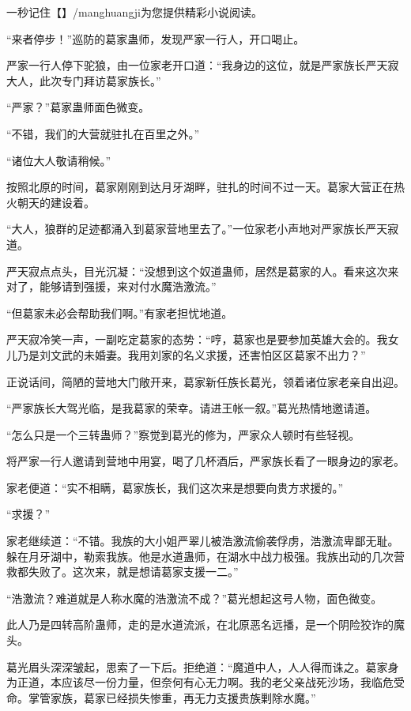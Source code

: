 
\begin{this_body}

一秒记住【】/manghuangji为您提供精彩小说阅读。

“来者停步！”巡防的葛家蛊师，发现严家一行人，开口喝止。

严家一行人停下驼狼，由一位家老开口道：“我身边的这位，就是严家族长严天寂大人，此次专门拜访葛家族长。”

“严家？”葛家蛊师面色微变。

“不错，我们的大营就驻扎在百里之外。”

“诸位大人敬请稍候。”

按照北原的时间，葛家刚刚到达月牙湖畔，驻扎的时间不过一天。葛家大营正在热火朝天的建设着。

“大人，狼群的足迹都涌入到葛家营地里去了。”一位家老小声地对严家族长严天寂道。

严天寂点点头，目光沉凝：“没想到这个奴道蛊师，居然是葛家的人。看来这次来对了，能够请到强援，来对付水魔浩激流。”

“但葛家未必会帮助我们啊。”有家老担忧地道。

严天寂冷笑一声，一副吃定葛家的态势：“哼，葛家也是要参加英雄大会的。我女儿乃是刘文武的未婚妻。我用刘家的名义求援，还害怕区区葛家不出力？”

正说话间，简陋的营地大门敞开来，葛家新任族长葛光，领着诸位家老亲自出迎。

“严家族长大驾光临，是我葛家的荣幸。请进王帐一叙。”葛光热情地邀请道。

“怎么只是一个三转蛊师？”察觉到葛光的修为，严家众人顿时有些轻视。

将严家一行人邀请到营地中用宴，喝了几杯酒后，严家族长看了一眼身边的家老。

家老便道：“实不相瞒，葛家族长，我们这次来是想要向贵方求援的。”

“求援？”

家老继续道：“不错。我族的大小姐严翠儿被浩激流偷袭俘虏，浩激流卑鄙无耻。躲在月牙湖中，勒索我族。他是水道蛊师，在湖水中战力极强。我族出动的几次营救都失败了。这次来，就是想请葛家支援一二。”

“浩激流？难道就是人称水魔的浩激流不成？”葛光想起这号人物，面色微变。

此人乃是四转高阶蛊师，走的是水道流派，在北原恶名远播，是一个阴险狡诈的魔头。

葛光眉头深深皱起，思索了一下后。拒绝道：“魔道中人，人人得而诛之。葛家身为正道，本应该尽一份力量，但奈何有心无力啊。我的老父亲战死沙场，我临危受命。掌管家族，葛家已经损失惨重，再无力支援贵族剿除水魔。”


\end{this_body}
